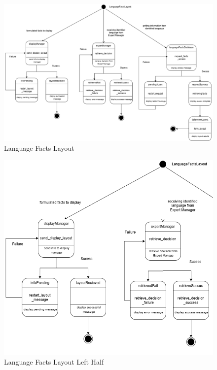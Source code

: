 \begin{figure}[H]
	\centering
	\includegraphics[width=\textwidth, height=\textheight, keepaspectratio]{Section2/images/Language_Facts_Layout_state_diagramV3.png}
	\caption{Language Facts Layout}
	\label{FormController}
\end{figure}

\begin{figure}[H]
	\centering
	\includegraphics[width=\textwidth, height=0.95\textheight, keepaspectratio]{Section2/images/Language_Facts_Layout_state_diagramV3Left.png}
	\caption{Language Facts Layout Left Half}
	\label{FormController}
\end{figure}

